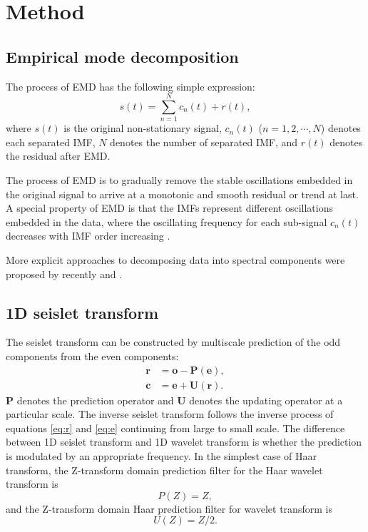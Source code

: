 \section{Method}
\subsection{Empirical mode decomposition}
The process of EMD has the following simple expression: 
\begin{equation}
\label{eq:emd}
s(t)=\sum_{n=1}^{N}c_n(t)+r(t),
\end{equation}
where $s(t)$ is the original non-stationary signal, $c_n(t)$ ($n=1,2,\cdots,N$) denotes each separated IMF, $N$ denotes the number of separated IMF, and $r(t)$ denotes the residual after EMD.

The process of EMD is to gradually remove the stable oscillations embedded in the original signal to arrive at a monotonic and smooth residual or trend at last. A special property of EMD is that the IMFs represent different oscillations embedded in the data, where the oscillating frequency for each sub-signal $c_n(t)$ decreases with IMF order increasing \cite[]{huangemd,yangkang20141}. %

More explicit approaches to decomposing data into spectral components were proposed by recently \cite{fomel20132} and \cite{hou2}.

\subsection{1D seislet transform}
The seislet transform can be constructed by multiscale prediction of the odd components from the even components:
\begin{align}
\label{eq:r}
\mathbf{r}&=\mathbf{o}-\mathbf{P}(\mathbf{e}), \\
\label{eq:e}
\mathbf{c}&=\mathbf{e}+\mathbf{U}(\mathbf{r}).
\end{align}
$\mathbf{P}$ denotes the prediction operator and $\mathbf{U}$ denotes the updating operator at a particular scale. The inverse seislet transform follows the inverse process of equations \ref{eq:r} and \ref{eq:e} continuing from large to small scale. The difference between 1D seislet transform and 1D wavelet transform is whether the prediction is modulated by an appropriate frequency. In the simplest case of Haar transform, the Z-transform domain prediction filter for the Haar wavelet transform is 
\begin{equation}
\label{eq:haar}
P(Z)=Z,
\end{equation}
and the Z-transform domain Haar prediction filter for wavelet transform is 
\begin{equation}
\label{eq:haaru}
U(Z)=Z/2.
\end{equation}

